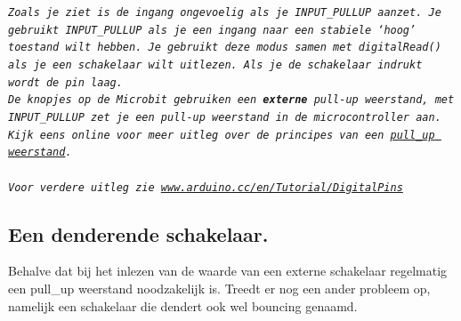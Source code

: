 \begin{minipage}{\linewidth}
\footnotesize{\texttt{\textit{Zoals je ziet is de ingang ongevoelig als je \textcolor{arduinoBlue}{INPUT\_PULLUP} aanzet. Je gebruikt \textcolor{arduinoBlue}{INPUT\_PULLUP} als je een ingang naar een stabiele ‘hoog’ toestand wilt hebben. Je gebruikt deze modus samen met digitalRead() als je een schakelaar wilt uitlezen. Als je de schakelaar indrukt wordt de pin laag.\\
De knopjes op de Microbit gebruiken een \textbf{externe} pull-up weerstand, met \textcolor{arduinoBlue}{INPUT\_PULLUP} zet je een pull-up weerstand in de microcontroller aan.\\ Kijk eens online voor meer uitleg over de principes van een  \href{https://www.freecodecamp.org/news/a-simple-explanation-of-pull-down-and-pull-up-resistors-660b308f116a/}{pull\_up weerstand}.\\ \\
Voor verdere uitleg zie \href{https://www.arduino.cc/en/Tutorial/DigitalPins}{www.arduino.cc/en/Tutorial/DigitalPins}
}}}
\end{minipage}
\normalsize
\subsection{Een denderende schakelaar.}

Behalve dat bij het inlezen van de waarde van een externe schakelaar regelmatig een pull\_up weerstand noodzakelijk is. 
Treedt er nog een ander probleem op, namelijk een schakelaar die dendert ook wel bouncing genaamd.

